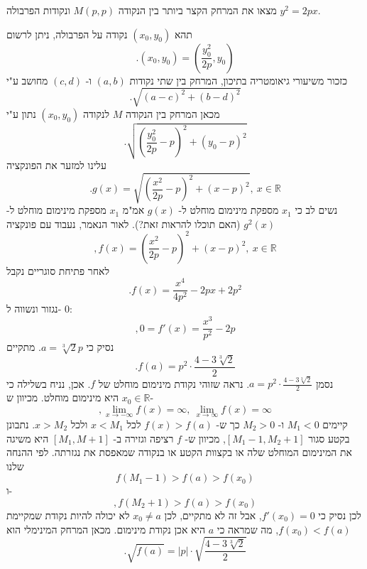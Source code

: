 מצאו את המרחק הקצר ביותר בין הנקודה \(M(p, p)\) ונקודות הפרבולה \(y^2 = 2px\).

\begin{solbox}
תהא
$(x_0,y_0)$
נקודה על הפרבולה, ניתן לרשום
$$.(x_0,y_0)=\left(\frac{y_0^2}{2p},y_0\right)$$
כזכור משיעורי גיאומטריה בתיכון, המרחק בין שתי נקודות
$(a,b)$
ו-
$(c,d)$
מחושב ע"י
$$.\sqrt{(a-c)^2+(b-d)^2}$$
מכאן המרחק בין הנקודה
$M$
לנקודה
$(x_0,y_0)$
נתון ע"י
$$.\sqrt{\left(\frac{y_0^2}{2p}-p\right)^2+(y_0-p)^2}$$
עלינו למזער את הפונקציה
$$.g(x)=\sqrt{\left(\frac{x^2}{2p}-p\right)^2+(x-p)^2},\ x\in\mathbb{R}$$
נשים לב כי
$x_1$
מספקת מינימום מוחלט ל-
$g(x)$
אמ"מ
$x_1$
מספקת מינימום מוחלט ל-
$g^2(x)$
(האם תוכלו להראות זאת?).
לאור הנאמר, נעבוד עם פונקציה
$$,f(x)=\left(\frac{x^2}{2p}-p\right)^2+(x-p)^2,\ x\in\mathbb{R}$$
לאחר פתיחת סוגריים נקבל
$$.f(x)=\frac{x^4}{4p^2}-2px+2p^2$$
נגזור ונשווה ל-
$0$:
$$,0=f'(x)=\frac{x^3}{p^2}-2p$$
נסיק כי
$a=\sqrt[3]{2}p$.
מתקיים
$$.f(a)=p^2\cdot\frac{4-3\sqrt[3]{2}}{2}$$
נסמן
$a=p^2\cdot\frac{4-3\sqrt[3]{2}}{2}$.
נראה שזוהי נקודת מינימום מוחלט של
$f$.
אכן, נניח בשלילה כי
$x_0\in\mathbb{R}$
היא מינימום מוחלט.
מכיוון ש-
$$,\lim_{x\to-\infty}f(x)=\infty,\ \lim_{x\to\infty}f(x)=\infty$$
קיימים
$M_1<0$
ו-
$M_2>0$
כך ש-
$f(x)>f(a)$
לכל
$x<M_1$
ולכל
$x>M_2$.
נתבונן בקטע סגור
$[M_1-1,M_2+1]$,
 מכיוון ש-
$f$
רציפה וגזירה ב-
$[M_1,M+1]$
היא משיגה את המינימום המוחלט שלה או בקצוות הקטע או בנקודה
שמאפסת את נגזרתה.
לפי ההנחה שלנו
$$f(M_1-1)>f(a)>f(x_0)$$
ו-
$$,f(M_2+1)>f(a)>f(x_0)$$
לכן נסיק כי
$f'(x_0)=0$,
אבל זה לא מתקיים, לכן
$x_0\neq a$
לא יכולה להיות נקודת שמקיימת
$f(x_0)<f(a)$,
מה שמראה כי
$a$
היא אכן נקודת מינימום.
מכאן המרחק המינימלי הוא
$$.\sqrt{f(a)}=|p|\cdot\sqrt{\frac{4-3\sqrt[3]{2}}{2}}$$
\end{solbox}
